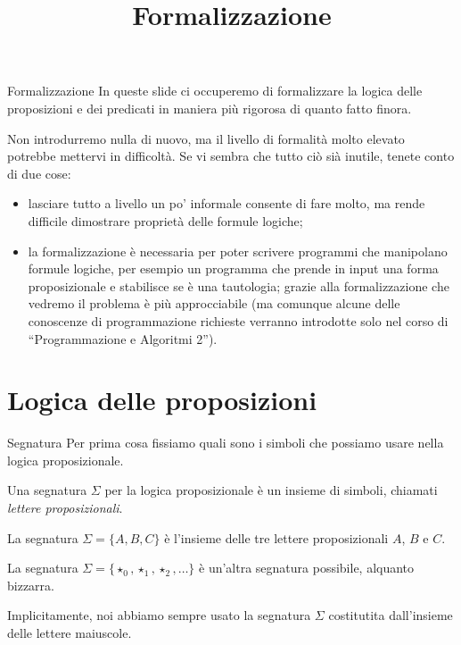 \documentclass[aspectratio=169,10pt,dvipsnames,xcolor=table,handout]{beamer}
\title{Formalizzazione}
\begin{document}
\begin{frame}
    \titlepage
\end{frame}

\begin{frame}{Formalizzazione}
    In queste slide ci occuperemo di formalizzare la logica delle proposizioni e dei predicati in maniera più rigorosa di quanto fatto finora.

    \medskip Non introdurremo nulla di nuovo, ma il livello di formalità molto elevato potrebbe mettervi in difficoltà. Se vi sembra che tutto ciò sià inutile, tenete conto di due cose:
    \begin{itemize}
        \item lasciare tutto a livello un po' informale consente di fare molto, ma rende difficile dimostrare proprietà delle formule logiche;
        \item la formalizzazione è necessaria per poter scrivere programmi che manipolano formule logiche, per esempio un programma che prende in input una forma proposizionale e stabilisce se è una tautologia; grazie alla formalizzazione che vedremo il problema è più approcciabile (ma comunque alcune delle conoscenze di programmazione richieste verranno introdotte solo nel corso di ``Programmazione e Algoritmi 2'').
    \end{itemize}
\end{frame}

\section{Logica delle proposizioni}

\begin{frame}{Segnatura}
    Per prima cosa fissiamo quali sono i simboli che possiamo usare nella logica proposizionale.
    \pause

    \begin{definition}[Segnatura]
        Una \alert{segnatura} $\Sigma$ per la logica proposizionale è un insieme di simboli, chiamati \emph{lettere proposizionali}.
    \end{definition}

    \pause
    \begin{example}
        La segnatura $\Sigma = \{A, B, C\}$ è l'insieme delle tre lettere proposizionali $A$, $B$ e $C$.
    \end{example}

    \pause
    \begin{example}
        La segnatura $\Sigma = \{\star_0, \star_1, \star_2, \ldots \}$ è un'altra segnatura possibile, alquanto bizzarra.
    \end{example}

    \pause
    Implicitamente, noi abbiamo sempre usato la segnatura $\Sigma$ costitutita dall'insieme delle lettere maiuscole.
\end{frame}
\end{document}
